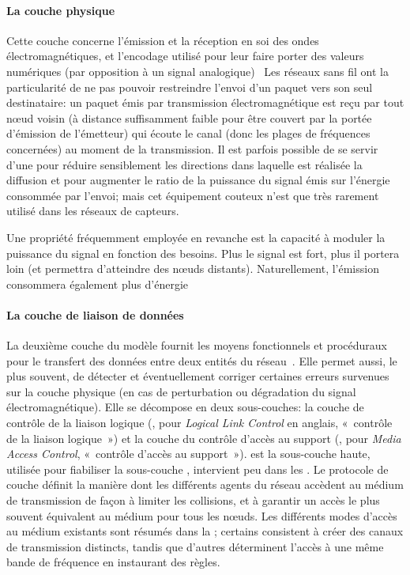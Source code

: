            \paragraph{La couche physique}
Cette couche concerne l'émission et la réception en soi des ondes électromagnétiques, et l'encodage utilisé pour leur faire porter des valeurs numériques (par opposition à un signal analogique)~\cite{TW10}
Les réseaux sans fil ont la particularité de ne pas pouvoir restreindre l'envoi d'un paquet vers son seul destinataire: un paquet émis par transmission électromagnétique est reçu par tout nœud voisin (\cad à distance suffisamment faible pour être couvert par la portée d'émission de l'émetteur) qui écoute le canal (donc les plages de fréquences concernées) au moment de la transmission.
Il est parfois possible de se servir d'une  pour réduire sensiblement les directions dans laquelle est réalisée la diffusion et pour augmenter le ratio de la puissance du signal émis sur l'énergie consommée par l'envoi; mais cet équipement couteux n'est que très rarement utilisé dans les réseaux de capteurs.

Une propriété fréquemment employée en revanche est la capacité à moduler la puissance du signal en fonction des besoins.
Plus le signal est fort, plus il portera loin (et permettra d'atteindre des nœuds distants).
Naturellement, l'émission consommera également plus d'énergie

            \paragraph{La couche de liaison de données}\label{st:ssec:mac}
La deuxième couche du modèle fournit les moyens fonctionnels et procéduraux pour le transfert des données entre deux entités du réseau~\cite{TW10}.
Elle permet aussi, le plus souvent, de détecter et éventuellement corriger certaines erreurs survenues sur la couche physique (en cas de perturbation ou dégradation du signal électromagnétique).
Elle se décompose en deux sous-couches: la couche de contrôle de la liaison logique (\llc, pour \textit{Logical Link Control} en anglais, « contrôle de la liaison logique ») et la couche du contrôle d'accès au support (\mac, pour \textit{Media Access Control}, « contrôle d'accès au support »).
\llc est la sous-couche haute, utilisée pour fiabiliser la sous-couche \mac, intervient peu dans les \rcs.
Le protocole de couche \mac définit la manière dont les différents agents du réseau accèdent au médium de transmission de façon à limiter les collisions, et à garantir un accès le plus souvent équivalent au médium pour tous les nœuds.
Les différents modes d'accès au médium existants sont résumés dans la ; certains consistent à créer des canaux de transmission distincts, tandis que d'autres déterminent l'accès à une même bande de fréquence en instaurant des règles.

